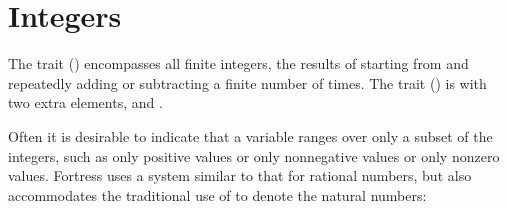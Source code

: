 %
%
%
%

\newpage
\section{Integers}

The trait  () encompasses all finite integers,
the results of starting from  and repeatedly adding or subtracting  a finite number of times.
The trait  () is  with
two extra elements, \EXP{+\infty} and \EXP{-\infty}.

Often it is desirable to indicate that a variable ranges over only a subset of
the integers, such as only positive values or only nonnegative values or only
nonzero values.
Fortress uses a system similar to that for rational numbers, but also
accommodates the traditional use of  to denote the natural numbers:

